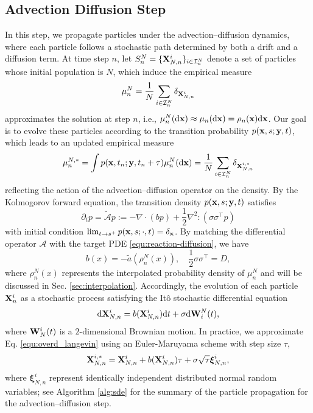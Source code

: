 \documentclass[a4paper,fleqn]{cas-sc}
\newcommand{\mhyphen}{\text{-}}
\theoremstyle{definition}
\theoremstyle{remark}
\begin{document}
\subsection{Advection Diffusion Step}
\label{sec:adevection_diffusion}
In this step, we propagate particles under the advection–diffusion dynamics, where each particle follows a stochastic path determined by both a drift and a diffusion term. At time step $n$, let $S^N_n = \{\mathbf{X}^i_{N,n}\}_{i\in \mathcal I_n^N}$ denote  a set of particles  whose initial population is $N$, which induce the empirical measure 
\[
\mu^N_{n}= \frac{1}{N}\sum_{i\in \mathcal I_n^N}\delta_{\mathbf{X}_{N,n}^i}
\] 
approximates the solution at step $n$, i.e.,  $\mu^N_{n} (\mathrm{d} \mathbf{x}) \approx \mu_n(\mathrm{d} \mathbf{x}) = \rho_n(\mathbf{x})\mathrm{d} \mathbf{x}$. 
Our goal is to evolve these particles according to the transition probability $p(\mathbf{x},s;\mathbf{y},t)$, which leads to an updated empirical measure
\[\mu_n^{N,*} = \int p(\mathbf{x},t_n;\mathbf{y},t_n+\tau)  \mu_n^N(\mathrm{d} \mathbf{x}) =   \frac{1}{N}\sum_{i\in \mathcal I_n^N}\delta_{\mathbf{X}_{N,n}^{i,*}}
\]  
reflecting the action of the advection--diffusion operator on the density.
By the Kolmogorov forward equation, the transition density $p(\mathbf{x},s;\mathbf{y},t)$ satisfies 
\begin{equation}
    \partial_t p = \tilde {\mathcal A }p := - \nabla \cdot(b  p) + \frac{1}{2}\nabla^2:(\sigma \sigma^\top p) 
\end{equation}
with initial condition $\lim_{t\to s^+} p(\mathbf{x},s;\cdot,t) = \delta_{\mathbf{x}}$. By matching the differential operator $\mathcal A$ with the target PDE \eqref{equ:reaction-diffusion}, we have 
\begin{equation}
    b(x) = -\tilde a(\rho^N_n(x)), \quad \frac{1}{2}\sigma \sigma^\top = D,
\end{equation}
where $\rho^N_n(x)$ represents the interpolated probability density of $\mu_n^N$ and will be discussed in Sec. \ref{sec:interpolation}.
%
Accordingly, the evolution of each particle $\mathbf{X}^i_n$ as a stochastic process satisfying the It\^o stochastic differential equation
\begin{equation}\label{equ:overd_langevin}
    \mathrm{d} \mathbf{X}_{N,n}^i = b(\mathbf{X}_{N,n}^i) \mathrm{d} t  + \sigma \mathrm{d} \mathbf{W}^N_{i}(t),
\end{equation}
where $\mathbf{W}^i_{N}(t)$ is a $2\mhyphen$dimensional Brownian motion. 
In practice, we approximate Eq. \eqref{equ:overd_langevin} using an Euler-Maruyama scheme with step size $\tau$, 
\begin{equation}
 \mathbf{X}_{N,n}^{i,*} = \mathbf{X}_{N,n}^{i} + b(\mathbf{X}_{N,n}^i) \tau  + \sigma \sqrt{\tau} \boldsymbol{\xi}^i_{N,n},
 \label{eq:euler_maruyama}
\end{equation}
where $\boldsymbol{\xi}^i_{N,n}$ represent identically independent distributed normal random variables; see Algorithm \ref{alg:sde} for the summary of the particle propagation for the advection--diffusion step. 
\end{document}
